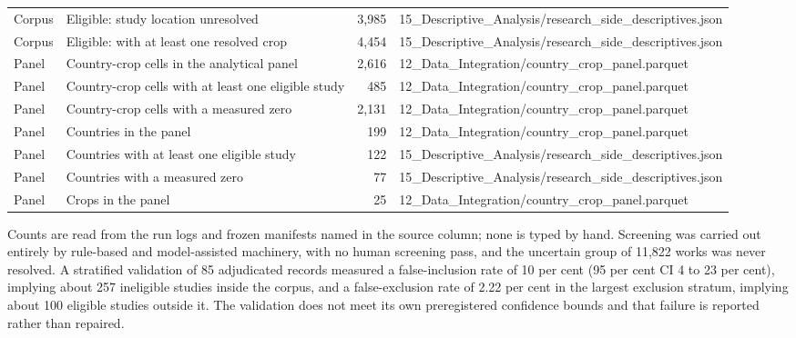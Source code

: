 \begin{table}[htbp]
\begin{tabular}{llrl}
Corpus & Eligible: study location unresolved & 3,985 & 15\_Descriptive\_Analysis/research\_side\_descriptives.json \\
Corpus & Eligible: with at least one resolved crop & 4,454 & 15\_Descriptive\_Analysis/research\_side\_descriptives.json \\
Panel & Country-crop cells in the analytical panel & 2,616 & 12\_Data\_Integration/country\_crop\_panel.parquet \\
Panel & Country-crop cells with at least one eligible study & 485 & 12\_Data\_Integration/country\_crop\_panel.parquet \\
Panel & Country-crop cells with a measured zero & 2,131 & 12\_Data\_Integration/country\_crop\_panel.parquet \\
Panel & Countries in the panel & 199 & 12\_Data\_Integration/country\_crop\_panel.parquet \\
Panel & Countries with at least one eligible study & 122 & 15\_Descriptive\_Analysis/research\_side\_descriptives.json \\
Panel & Countries with a measured zero & 77 & 15\_Descriptive\_Analysis/research\_side\_descriptives.json \\
Panel & Crops in the panel & 25 & 12\_Data\_Integration/country\_crop\_panel.parquet \\
\bottomrule
\end{tabular}
\begin{minipage}{\linewidth}\footnotesize
Counts are read from the run logs and frozen manifests named in the source column; none is typed by hand. Screening was carried out entirely by rule-based and model-assisted machinery, with no human screening pass, and the uncertain group of 11,822 works was never resolved. A stratified validation of 85 adjudicated records measured a false-inclusion rate of 10 per cent (95 per cent CI 4 to 23 per cent), implying about 257 ineligible studies inside the corpus, and a false-exclusion rate of 2.22 per cent in the largest exclusion stratum, implying about 100 eligible studies outside it. The validation does not meet its own preregistered confidence bounds and that failure is reported rather than repaired.
\end{minipage}
\end{table}
